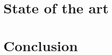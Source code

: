 \documentclass[8pt]{beamer}
\begin{document}
\section{State of the art}
%		
		
\section{Conclusion}
		

%		
%		
%		
%		
%		
%		
\end{document}
